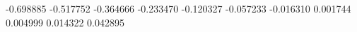 -0.698885
-0.517752
-0.364666
-0.233470
-0.120327
-0.057233
-0.016310
0.001744
0.004999
0.014322
0.042895
